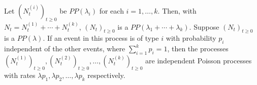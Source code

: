  Let $(N^{(i)}_t)_{t \ge 0}$ be $PP(\lambda_i)$ for each $i = 1, \ldots, k$. Then, with $N_t = N^{(1)}_t + \cdots + N^{(k)}_t$, $(N_t)_{t \ge 0}$ is a $PP(\lambda_1 + \cdots + \lambda_k)$.
 Suppose $(N_t)_{t \ge 0}$ is a $PP(\lambda)$. If an event in this process is of type $i$ with probability $p_i$ independent of the other events, where $\sum^k_{i=1} p_i = 1$, then the processes $(N^{(1)}_t)_{t \ge 0}, (N^{(2)}_t)_{t \ge 0}, \ldots, (N^{(k)}_t)_{t \ge 0}$ are independent Poisson processes with rates $\lambda p_1, \lambda p_2, \ldots, \lambda p_k$ respectively.